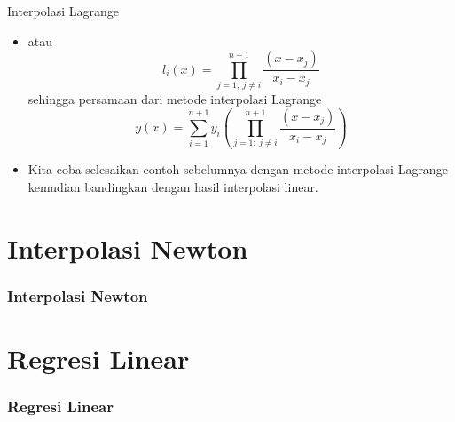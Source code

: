 \documentclass[pdflatex,compress]{beamer}
\begin{document}
\begin{frame}{Interpolasi Lagrange}
	\begin{itemize}
		\item atau
		\begin{equation*}
			l_i(x) = \prod\limits_{j = 1;~j \neq i}^{n+1} \frac{(x - x_j)}{x_i - x_j}
		\end{equation*}
		sehingga persamaan dari metode interpolasi Lagrange
		\begin{equation*}
			y(x) = \sum\limits_{i=1}^{n+1}y_i \left( \prod\limits_{j = 1;~j \neq i}^{n+1} \frac{(x - x_j)}{x_i - x_j} \right)
		\end{equation*}
		\item Kita coba selesaikan contoh sebelumnya dengan metode interpolasi Lagrange kemudian bandingkan dengan hasil interpolasi linear.
	\end{itemize}
\end{frame}

\section{Interpolasi Newton}

\begin{frame}
	\frametitle{Interpolasi Newton}
\end{frame}

\section{Regresi Linear}

\begin{frame}
	\frametitle{Regresi Linear}
\end{frame}
\end{document}
